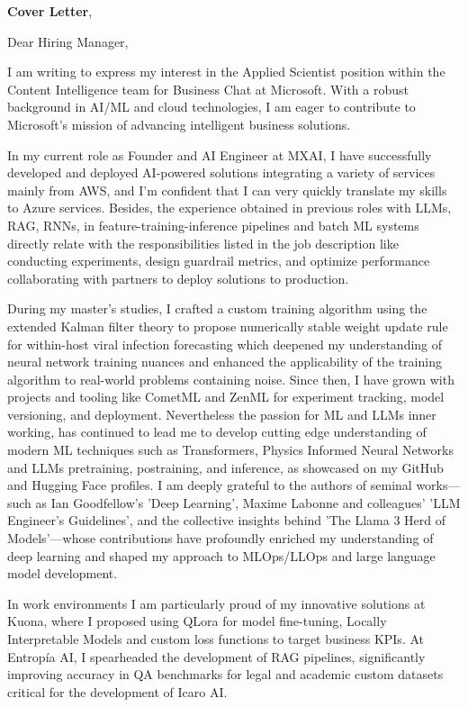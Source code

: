 \documentclass[11pt,a4paper,roman]{moderncv}
\begin{document}
\date{\today}
\opening{\textbf{Cover Letter}, \vspace{-1em}}

\makelettertitle

Dear Hiring Manager,

I am writing to express my interest in the Applied Scientist 
position within the Content Intelligence team for Business Chat 
at Microsoft. With a robust background in AI/ML and cloud technologies, 
I am eager to contribute to Microsoft's mission of advancing 
intelligent business solutions.

In my current role as Founder and AI Engineer at MXAI, I have 
successfully developed and deployed AI-powered solutions integrating a 
variety of services mainly from AWS, and I'm 
confident that I can very quickly translate my skills to Azure services. 
Besides, the experience obtained in previous roles with LLMs, RAG, RNNs, 
in feature-training-inference pipelines and batch ML systems directly 
relate with the responsibilities listed in the job description like 
conducting experiments, design guardrail metrics, and optimize performance 
collaborating with partners to deploy solutions to production.


During my master's studies, I crafted a custom training algorithm using 
the extended Kalman filter theory to propose numerically stable weight 
update rule for within-host viral infection forecasting which deepened 
my understanding of neural network training nuances and enhanced the 
applicability of the training algorithm to real-world problems containing noise. 
Since then, 
I have grown with projects and tooling like CometML and ZenML for experiment 
tracking, model versioning, and deployment. 
Nevertheless the passion for ML and LLMs inner working, has continued to 
lead me to 
develop cutting edge understanding of modern ML techniques such as 
Transformers, Physics Informed 
Neural Networks and LLMs pretraining, postraining, and inference, 
as showcased on my GitHub and Hugging Face 
profiles. I am deeply grateful to the authors of seminal works—such 
as Ian Goodfellow's 'Deep Learning', Maxime Labonne and colleagues' 
'LLM Engineer's Guidelines', and the collective insights behind 
'The Llama 3 Herd of Models'—whose contributions have profoundly 
enriched my understanding of deep learning and shaped my approach 
to MLOps/LLOps and large language model development. 

In work environments I am particularly proud of my innovative 
solutions at Kuona, 
where I proposed using QLora for model fine-tuning, Locally 
Interpretable Models and custom loss functions to target 
business KPIs. At Entropía AI, I spearheaded the development of 
RAG pipelines, significantly improving accuracy in QA benchmarks 
for legal and academic custom datasets critical for the 
development of Icaro AI.
\end{document}
